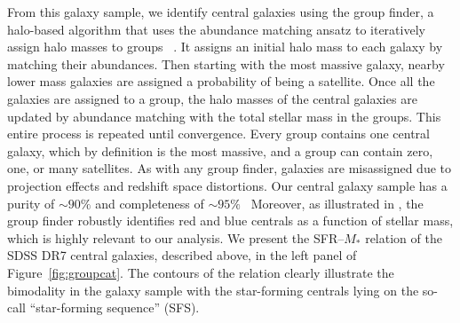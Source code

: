 \documentclass[12pt, letterpaper, preprint, tighten]{aastex62}
\newcommand{\edt}[1]{{\color{dred}{\bf} #1}}
\begin{document}
From this galaxy sample, we identify central galaxies using the
\cite{tinker2011} group finder, a halo-based algorithm that uses
the abundance matching ansatz to iteratively assign halo masses to
groups~\edt{\citep[see also][]{yang2005}}.
It assigns an initial halo mass to each galaxy by matching their
abundances. Then starting with the most massive galaxy, nearby lower
mass galaxies are assigned a probability of being a satellite. Once all
the galaxies are assigned to a group, the halo masses of the central galaxies
are updated by abundance matching with the total stellar mass in the groups.
This entire process is repeated until convergence. Every group contains one
central galaxy, which by definition is the most massive, and a group can
contain zero, one, or many satellites.
As with any group finder, galaxies are misassigned due to projection
effects and redshift space distortions. Our central galaxy sample has
a purity of ${\sim}90\%$ and completeness of ${\sim}95\%$~\citep{tinker2018}
Moreover, as illustrated in \cite{campbell2015}, the \cite{tinker2011} group
finder robustly identifies red and blue centrals as a function of stellar mass,
which is highly relevant to our analysis.
We present the SFR--$M_*$ relation of the SDSS DR7 central galaxies, described
above, in the left panel of Figure~\ref{fig:groupcat}. The contours of the
relation clearly illustrate the bimodality in the galaxy sample with the
star-forming centrals lying on the so-call ``star-forming sequence'' (SFS).
\end{document}
